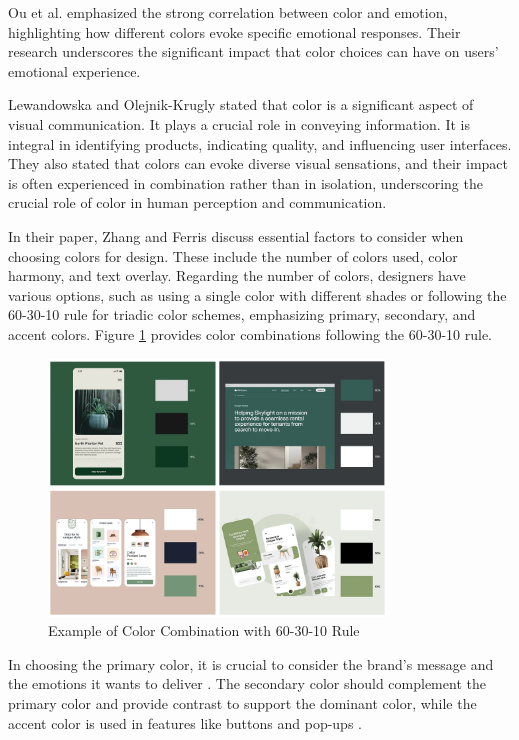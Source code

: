 Ou et al. \cite{Ou04} emphasized the strong correlation between color and emotion, highlighting how different colors evoke specific emotional responses. Their research underscores the significant impact that color choices can have on users' emotional experience.

Lewandowska and Olejnik-Krugly \cite{Lewandowska2021} stated that color is a significant aspect of visual communication. It plays a crucial role in conveying information. It is integral in identifying products, indicating quality, and influencing user interfaces. They also stated that colors can evoke diverse visual sensations, and their impact is often experienced in combination rather than in isolation, underscoring the crucial role of color in human perception and communication.

In their paper, Zhang and Ferris \cite{Zhang16} discuss essential factors to consider when choosing colors for design. These include the number of colors used, color harmony, and text overlay. Regarding the number of colors, designers have various options, such as using a single color with different shades or following the 60-30-10 rule for triadic color schemes, emphasizing primary, secondary, and accent colors. Figure \ref{fig:color-scheme} provides color combinations following the 60-30-10 rule.

\begin{figure}[!ht]
    \centering
    \includegraphics[width=0.8\textwidth]{texs/Part2/chapter3/image/colorexample.png}
    \caption{Example of Color Combination with 60-30-10 Rule \cite{M._2023}}
    \label{fig:color-scheme}
\end{figure}

In choosing the primary color, it is crucial to consider the brand's message and the emotions it wants to deliver \cite{M._2023}. The secondary color should complement the primary color and provide contrast to support the dominant color, while the accent color is used in features like buttons and pop-ups  \cite{M._2023}.

